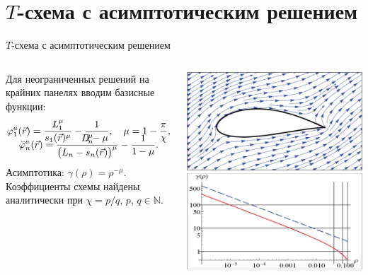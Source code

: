 \documentclass[ignoreonframetext,unicode]{beamer}
\begin{document}
\section{$T$-схема с асимптотическим решением}
\begin{frame}{$T$-схема с асимптотическим решением}
	\begin{columns}\vspace*{-3.5mm}
			Для неограниченных решений на крайних панелях вводим базисные функции:
		\begin{gather*}
		\vspace*{-4.5mm}
			\varphi_1^{a}(\vec r)=\frac{L_1^\mu}{s_1(\vec r)^{\mu}}-\frac{1}{1-\mu},\quad \mu=1-\frac{\pi}{\chi},\\
			\bar{\varphi}_n^{a}(\vec r)=\frac{L_n^\mu}{\bigl(L_n-s_n(\vec r)\bigr)^{\mu}}-\frac{1}{1-\mu}.
		\end{gather*}\vspace*{-0.5mm}
		Асимптотика: $\gamma(\rho)=\rho^{-\mu}$.\\
		Коэффициенты схемы найдены аналитически при $\chi=p/q$, $p$, $q\in \mathbb{N}$.
		\begin{columns}
		\includegraphics[width=\textwidth]{ris10}
		\includegraphics[width=\textwidth]{ris11}

\end{columns}
\end{columns}
\end{frame}
\end{document}
